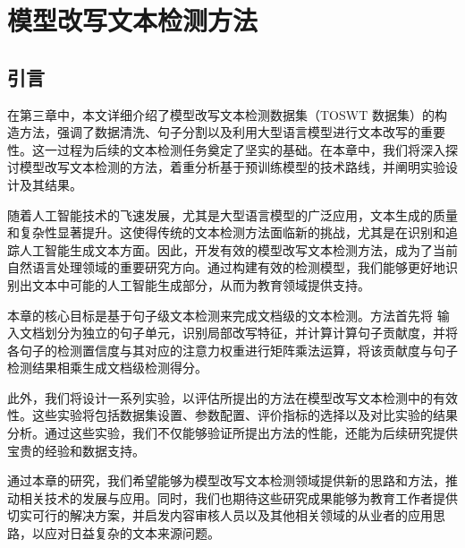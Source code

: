 
\chapter{模型改写文本检测方法}
\label{chap:method}

\section{引言}
\label{sec:method-intro}

在第三章中，本文详细介绍了模型改写文本检测数据集（TOSWT 数据集）的构造方法，强调了数据清洗、句子分割以及利用大型语言模型进行文本改写的重要性。这一过程为后续的文本检测任务奠定了坚实的基础。在本章中，我们将深入探讨模型改写文本检测的方法，着重分析基于预训练模型的技术路线，并阐明实验设计及其结果。

随着人工智能技术的飞速发展，尤其是大型语言模型的广泛应用，文本生成的质量和复杂性显著提升。这使得传统的文本检测方法面临新的挑战，尤其是在识别和追踪人工智能生成文本方面。因此，开发有效的模型改写文本检测方法，成为了当前自然语言处理领域的重要研究方向。通过构建有效的检测模型，我们能够更好地识别出文本中可能的人工智能生成部分，从而为教育领域提供支持。

本章的核心目标是基于句子级文本检测来完成文档级的文本检测。方法首先将
输入文档划分为独立的句子单元，识别局部改写特征，并计算计算句子贡献度，并将各句子的检测置信度与其对应的注意力权重进行矩阵乘法运算，将该贡献度与句子检测结果相乘生成文档级检测得分。

此外，我们将设计一系列实验，以评估所提出的方法在模型改写文本检测中的有效性。这些实验将包括数据集设置、参数配置、评价指标的选择以及对比实验的结果分析。通过这些实验，我们不仅能够验证所提出方法的性能，还能为后续研究提供宝贵的经验和数据支持。

通过本章的研究，我们希望能够为模型改写文本检测领域提供新的思路和方法，推动相关技术的发展与应用。同时，我们也期待这些研究成果能够为教育工作者提供切实可行的解决方案，并启发内容审核人员以及其他相关领域的从业者的应用思路，以应对日益复杂的文本来源问题。


